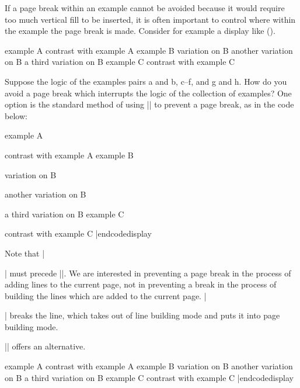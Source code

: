If a page break within an example cannot be avoided
because it would require too much vertical fill to be inserted,
it is often important to control where within the example the
page break is made.  Consider for example a display like
(\nextx).

\framedisplay
\pex[exbreakpenalty=-10,interpartskip=.25ex]
\a example A
\a contrast with example A\exbreak
\a example B
\a variation on B
\a another variation on B
\a a third variation on B\exbreak
\a example C
\a contrast with example C
\xe
\endframedisplay

Suppose the logic of the examples pairs a and b, c--f, and g and
h.  How do you avoid a page break which interrupts the logic of
the collection of examples?  One option is the standard \Tex\/
method of using |\nobreak| to prevent a page break, as in the
code below:

 \codedisplay
\pex[interpartskip=.25ex]
\a example A\par\nobreak
\a contrast with example A
\a example B\par\nobreak
\a variation on B\par\nobreak
\a another variation on B\par\nobreak
\a a third variation on B
\a example C\par\nobreak
\a contrast with example C
\xe |endcodedisplay

\noindent  Note that |\par| must precede |\nobreak|.  We are
interested in preventing a page break in the process of adding
lines to the current page, not in preventing a break in the
process of building the lines which are added to the current
page.  |\par| breaks the line, which takes \Tex\/  out of line
building mode and puts it into page building mode.

|\exbreak| offers an alternative.

\codedisplay
\pex[interpartskip=.25ex]
\a example A
\a contrast with example A\exbreak
\a example B
\a variation on B
\a another variation on B
\a a third variation on B\exbreak
\a example C
\a contrast with example C
\xe |endcodedisplay

%
%
%
%
%



\endinput





